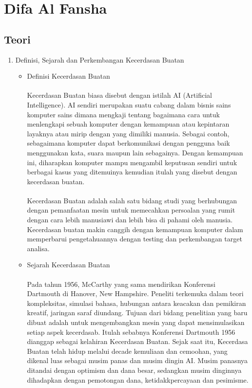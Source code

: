 \section{Difa Al Fansha}
\subsection{Teori}

\begin{enumerate}
	\item Definisi, Sejarah dan Perkembangan Kecerdasan Buatan

		\begin{itemize}
			\item Definisi Kecerdasan Buatan
				\paragraph{}
				Kecerdasan Buatan biasa disebut dengan istilah AI (Artificial Intelligence). AI sendiri merupakan suatu cabang dalam bisnis sains komputer sains dimana mengkaji tentang bagaimana cara untuk menlengkapi sebuah komputer dengan kemampuan atau kepintaran layaknya atau mirip dengan yang dimiliki manusia. Sebagai contoh, sebagaimana komputer dapat berkomunikasi dengan pengguna baik menggunakan kata, suara maupun lain sebagainya. Dengan kemampuan ini, diharapkan komputer mampu mengambil keputusan sendiri untuk berbagai kasus yang ditemuinya kemudian itulah yang disebut dengan kecerdasan buatan. 
				\paragraph{}
				Kecerdasan Buatan adalah salah satu bidang studi yang berhubungan dengan pemanfaatan mesin untuk memecahkan persoalan yang rumit dengan cara lebih manusiawi dan lebih bisa di pahami oleh manusia. Kecerdasan buatan makin canggih dengan kemampuan komputer dalam memperbarui pengetahuannya dengan testing dan perkembangan target analisa.
			
			\item Sejarah Kecerdasan Buatan
				\paragraph{}
				Pada tahun 1956, McCarthy yang sama mendirikan Konferensi Dartmouth di Hanover, New Hampshire. Peneliti terkemuka dalam teori kompleksitas, simulasi bahasa, hubungan antara keacakan dan pemikiran kreatif, jaringan saraf diundang. Tujuan dari bidang penelitian yang baru dibuat adalah untuk mengembangkan mesin yang dapat mensimulasikan setiap aspek kecerdasab. Itulah sebabnya Konferensi Dartmouth 1956 dianggap sebagai kelahiran Kecerdasan Buatan. Sejak saat itu, Kecerdasa Buatan telah hidup melalui decade kemuliaan dan cemoohan, yang dikenal luas sebagai musim panas dan musim dingin AI. Musim panasnya ditandai dengan optimism dan dana besar, sedangkan musim dinginnya dihadapkan dengan pemotongan dana, ketidakkpercayaan dan pesimisme.
				

\end{itemize}
\end{enumerate}
